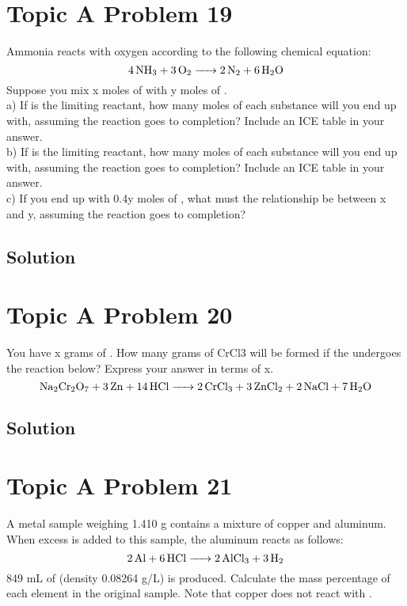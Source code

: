 \documentclass[10pt]{article}
\begin{document}
    \section{Topic A Problem 19}
        Ammonia reacts with oxygen according to the following chemical equation:
        \begin{equation}
            \ce{4 NH3 + 3 O2 -> 2 N2 + 6 H2O}
        \end{equation}
        Suppose you mix x moles of  with y moles of .\\
        a) If  is the limiting reactant, how many moles of each substance will you end up with, assuming the reaction goes to completion? 
        Include an ICE table in your answer.\\
        b) If  is the limiting reactant, how many moles of each substance will you end up with, assuming the reaction goes to completion? 
        Include an ICE table in your answer.\\
        c) If you end up with 0.4y moles of , what must the relationship be between x and y, assuming the reaction goes to completion?

        \subsection{Solution}

    \pagebreak
    \section{Topic A Problem 20}
        You have x grams of . 
        How many grams of CrCl3 will be formed if the  undergoes the reaction below? 
        Express your answer in terms of x.
        \begin{equation}
            \ce{Na2Cr2O7 + 3 Zn + 14 HCl -> 2 CrCl3 + 3 ZnCl2 + 2 NaCl + 7 H2O}
        \end{equation}

        \subsection{Solution}

    \pagebreak
    \section{Topic A Problem 21}
        A metal sample weighing 1.410 g contains a mixture of copper and aluminum. 
        When excess  is added to this sample, the aluminum reacts as follows:
        \begin{equation}
            \ce{2 Al + 6 HCl -> 2 AlCl3 + 3 H2}
        \end{equation}
        849 mL of  (density 0.08264 g/L) is produced. 
        Calculate the mass percentage of each element in the original sample. 
        Note that copper does not react with .
\end{document}
